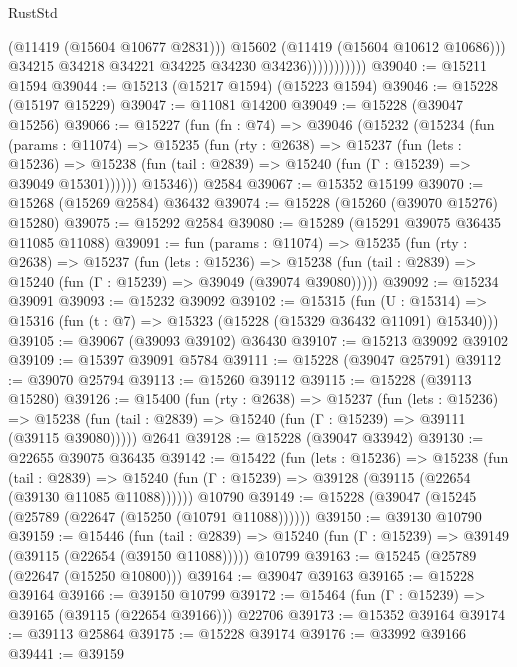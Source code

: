\begin{lexlean}{RustStd}
\begin{coremodule}
                              (@11419 (@15604 @10677 @2831)))
                            @15602
                            (@11419 (@15604 @10612 @10686)))
                          @34215
                          @34218
                          @34221
                          @34225
                          @34230
                          @34236)))))))))))
@39040 := @15211 @1594
@39044 := @15213 (@15217 @1594) (@15223 @1594)
@39046 := @15228 (@15197 @15229)
@39047 := @11081 @14200
@39049 := @15228 (@39047 @15256)
@39066 := @15227
    (fun (fn : @74) =>
    @39046
      (@15232
        (@15234
          (fun (params : @11074) =>
          @15235
            (fun (rty : @2638) =>
            @15237
              (fun (lets : @15236) =>
              @15238 (fun (tail : @2839) => @15240 (fun (Γ : @15239) => @39049 @15301))))))
        @15346))
    @2584
@39067 := @15352 @15199
@39070 := @15268 (@15269 @2584) @36432
@39074 := @15228 (@15260 (@39070 @15276) @15280)
@39075 := @15292 @2584
@39080 := @15289 (@15291 @39075 @36435 @11085 @11088)
@39091 := fun (params : @11074) =>
  @15235
    (fun (rty : @2638) =>
    @15237
      (fun (lets : @15236) =>
      @15238 (fun (tail : @2839) => @15240 (fun (Γ : @15239) => @39049 (@39074 @39080)))))
@39092 := @15234 @39091
@39093 := @15232 @39092
@39102 := @15315
    (fun (U : @15314) => @15316 (fun (t : @7) => @15323 (@15228 (@15329 @36432 @11091) @15340)))
@39105 := @39067 (@39093 @39102) @36430
@39107 := @15213 @39092 @39102
@39109 := @15397 @39091 @5784
@39111 := @15228 (@39047 @25791)
@39112 := @39070 @25794
@39113 := @15260 @39112
@39115 := @15228 (@39113 @15280)
@39126 := @15400
    (fun (rty : @2638) =>
    @15237
      (fun (lets : @15236) =>
      @15238 (fun (tail : @2839) => @15240 (fun (Γ : @15239) => @39111 (@39115 @39080)))))
    @2641
@39128 := @15228 (@39047 @33942)
@39130 := @22655 @39075 @36435
@39142 := @15422
    (fun (lets : @15236) =>
    @15238
      (fun (tail : @2839) =>
      @15240 (fun (Γ : @15239) => @39128 (@39115 (@22654 (@39130 @11085 @11088))))))
    @10790
@39149 := @15228 (@39047 (@15245 (@25789 (@22647 (@15250 (@10791 @11088))))))
@39150 := @39130 @10790
@39159 := @15446
    (fun (tail : @2839) => @15240 (fun (Γ : @15239) => @39149 (@39115 (@22654 (@39150 @11088)))))
    @10799
@39163 := @15245 (@25789 (@22647 (@15250 @10800)))
@39164 := @39047 @39163
@39165 := @15228 @39164
@39166 := @39150 @10799
@39172 := @15464 (fun (Γ : @15239) => @39165 (@39115 (@22654 @39166))) @22706
@39173 := @15352 @39164
@39174 := @39113 @25864
@39175 := @15228 @39174
@39176 := @33992 @39166
@39441 := @39159

\end{coremodule}
\end{lexlean}
